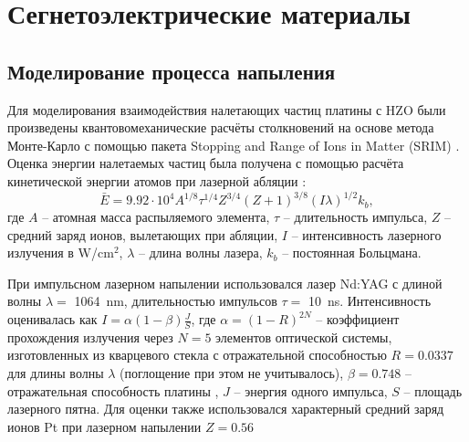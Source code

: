 \chapter{Сегнетоэлектрические материалы}\label{ch:ch2}

\section{Моделирование процесса напыления}\label{sec:ch2/sec2}
Для моделирования взаимодействия налетающих частиц платины с HZO были произведены квантовомеханические расчёты столкновений на основе метода Монте-Карло с помощью пакета Stopping and Range of Ions in Matter (SRIM) \cite{zieglerSRIMStoppingRange2010}. Оценка энергии налетаемых частиц была получена с помощью расчёта кинетической энергии атомов при лазерной абляции \cite{mutaevVLIYaNIEVERHNEYGRANICY2020}:
\[\bar{E} = 9.92 \cdot 10^{4} A^{1/8} \tau^{1/4} Z^{3/4} (Z+1)^{3/8} (I\lambda)^{1/2}k_b,\] где \(A\) -- атомная масса распыляемого элемента, \(\tau\) -- длительность импульса, \(Z\) -- средний заряд ионов, вылетающих при абляции, \(I\) -- интенсивность лазерного излучения в \si{\watt}/\si{\cm}\(^2\), \(\lambda\) -- длина волны лазера, \(k_b\) -- постоянная Больцмана.

При импульсном лазерном напылении использовался лазер Nd:YAG с длиной волны \(\lambda=\) \SI{1064}{\nano\meter}, длительностью импульсов \(\tau=\) \SI{10}{\nano\second}. Интенсивность оценивалась как \(I=\alpha(1-\beta)\frac{J}{S}\), где \(\alpha=(1-R)^{2N}\) -- коэффициент прохождения излучения через \(N=5\) элементов оптической системы, изготовленных из кварцевого стекла с отражательной способностью \(R=0.0337\) \cite{polyanskiyRefractiveindexInfoDatabase2024} для длины волны \(\lambda\) (поглощение при этом не учитывалось), \(\beta=0.748\) -- отражательная способность платины \cite{weberHandbookOpticalMaterials2003}, \(J\) -- энергия одного импульса, \(S\) -- площадь лазерного пятна. Для оценки также использовался характерный средний заряд ионов Pt при лазерном напылении $Z=0.56$ \cite[с.~141]{easonPulsedLaserDeposition2007}

